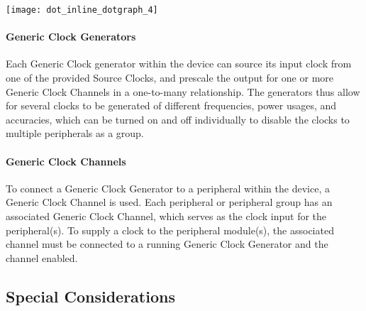 \label{group__asfdoc__sam0__system__clock__group_asfdoc_sam0_system_clock_module_chain_example_fig}%
\hypertarget{group__asfdoc__sam0__system__clock__group_asfdoc_sam0_system_clock_module_chain_example_fig}{}%
\begin{center}

\begin{DoxyImageNoCaption}
  \mbox{\texttt{[image: dot\_inline\_dotgraph\_4]}}
\end{DoxyImageNoCaption}
\end{center}
\hypertarget{group__asfdoc__sam0__system__clock__group_asfdoc_sam0_system_clock_module_overview_gclk_generators}{}\paragraph{Generic Clock Generators}\label{group__asfdoc__sam0__system__clock__group_asfdoc_sam0_system_clock_module_overview_gclk_generators}
Each Generic Clock generator within the device can source its input clock from one of the provided Source Clocks, and prescale the output for one or more Generic Clock Channels in a one-\/to-\/many relationship. The generators thus allow for several clocks to be generated of different frequencies, power usages, and accuracies, which can be turned on and off individually to disable the clocks to multiple peripherals as a group.\hypertarget{group__asfdoc__sam0__system__clock__group_asfdoc_sam0_system_clock_module_overview_gclk_channels}{}\paragraph{Generic Clock Channels}\label{group__asfdoc__sam0__system__clock__group_asfdoc_sam0_system_clock_module_overview_gclk_channels}
To connect a Generic Clock Generator to a peripheral within the device, a Generic Clock Channel is used. Each peripheral or peripheral group has an associated Generic Clock Channel, which serves as the clock input for the peripheral(s). To supply a clock to the peripheral module(s), the associated channel must be connected to a running Generic Clock Generator and the channel enabled.\hypertarget{group__asfdoc__sam0__system__clock__group_asfdoc_sam0_system_clock_special_considerations}{}\subsection{Special Considerations}\label{group__asfdoc__sam0__system__clock__group_asfdoc_sam0_system_clock_special_considerations}
